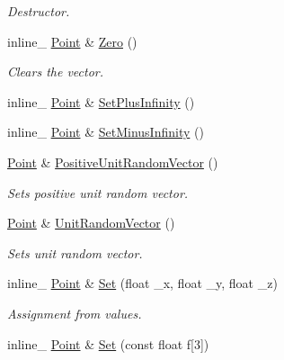 \begin{DoxyCompactItemize}
\begin{DoxyCompactList}\small\item\em Destructor. \end{DoxyCompactList}\item 
\hypertarget{class_point_a8effe6ba1410e857de6f026e14229c24}{inline\+\_\+ \hyperlink{class_point}{Point} \& \hyperlink{class_point_a8effe6ba1410e857de6f026e14229c24}{Zero} ()}\label{class_point_a8effe6ba1410e857de6f026e14229c24}

\begin{DoxyCompactList}\small\item\em Clears the vector. \end{DoxyCompactList}\item 
inline\+\_\+ \hyperlink{class_point}{Point} \& \hyperlink{class_point_ae5caa664712b58534de82365bade6bd6}{Set\+Plus\+Infinity} ()
\item 
inline\+\_\+ \hyperlink{class_point}{Point} \& \hyperlink{class_point_a9c151b5a1319468021765fbc2fe394b4}{Set\+Minus\+Infinity} ()
\item 
\hyperlink{class_point}{Point} \& \hyperlink{class_point_a0573b429de6f38d4c708468c965224b3}{Positive\+Unit\+Random\+Vector} ()
\begin{DoxyCompactList}\small\item\em Sets positive unit random vector. \end{DoxyCompactList}\item 
\hyperlink{class_point}{Point} \& \hyperlink{class_point_ae54251d03d185249914d51e3213e1081}{Unit\+Random\+Vector} ()
\begin{DoxyCompactList}\small\item\em Sets unit random vector. \end{DoxyCompactList}\item 
\hypertarget{class_point_ae6742f4c914004b7531d52e9c74d8fd1}{inline\+\_\+ \hyperlink{class_point}{Point} \& \hyperlink{class_point_ae6742f4c914004b7531d52e9c74d8fd1}{Set} (float \+\_\+x, float \+\_\+y, float \+\_\+z)}\label{class_point_ae6742f4c914004b7531d52e9c74d8fd1}

\begin{DoxyCompactList}\small\item\em Assignment from values. \end{DoxyCompactList}\item 
\hypertarget{class_point_a6c44540a081410570dbf657fae2e22b2}{inline\+\_\+ \hyperlink{class_point}{Point} \& \hyperlink{class_point_a6c44540a081410570dbf657fae2e22b2}{Set} (const float f\mbox{[}3\mbox{]})}\label{class_point_a6c44540a081410570dbf657fae2e22b2}


\end{DoxyCompactItemize}
